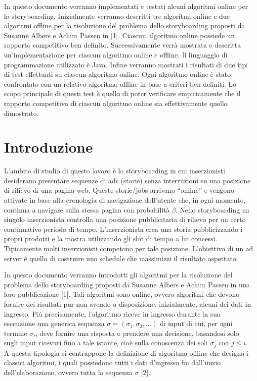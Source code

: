 \documentclass[twoside,openany,titlepage,fleqn,
	headinclude,12pt,a4paper,BCOR5mm,footinclude]{scrbook}
\begin{document}
In questo documento verranno implementati e testati alcuni algoritmi online per lo storyboarding. Inizialmente verranno descritti tre algoritmi online e due algoritmi offline per la risoluzione del problema dello storyboarding proposti da Susanne Albers e Achim Passen in [1]. Ciascun algoritmo online possiede un rapporto competitivo ben definito. Successivamente verrà mostrata e descritta un'implementazione per ciascun algoritmo online e offline. Il linguaggio di programmazione utilizzato è Java. Infine verranno mostrati i risultati di due tipi di test effettuati su ciascun algoritmo online. Ogni algoritmo online è stato confrontato con un relativo algoritmo offline in base a criteri ben definiti. Lo scopo principale di questi test è quello di poter verificare empiricamente che il rapporto competitivo di ciascun algoritmo online sia effettivamente quello dimostrato.
\tableofcontents
\listoffigures

\cleardoublepage
\chapter{Introduzione}
L’ambito di studio di questo lavoro è lo storyboarding in cui inserzionisti desiderano presentare sequenze di ads (storie) senza interruzioni su una posizione di rilievo di una pagina web. Queste storie/jobs arrivano “online” e vengono attivate in base alla cronologia di navigazione dell'utente che, in ogni momento, continua a navigare sulla stessa pagina con probabilità $\beta$. Nello storyboarding un singolo inserzionista controlla una posizione pubblicitaria di rilievo per un certo continuativo periodo di tempo. L’inserzionista crea una storia pubblicizzando i propri prodotti e la mostra utilizzando gli slot di tempo a lui concessi. Tipicamente molti inserzionisti competono per tale posizione. L’obiettivo di un ad server è quello di costruire uno schedule che massimizzi il risultato aspettato. 

In questo documento verranno introdotti gli algoritmi per la risoluzione del problema dello storyboarding proposti da Susanne Albers e Achim Passen in una loro pubblicazione [1]. Tali algoritmi sono online, ovvero algoritmi che devono fornire dei risultati pur non avendo a disposizione, inizialmente, alcuni dei dati in ingresso. Più precisamente, l'algoritmo riceve in ingresso durante la sua esecuzione una generica sequenza $\sigma = (\sigma_{1}, \sigma_{2}, ...)$ di input di cui, per ogni termine $\sigma_{i}$, deve fornire una risposta o prendere una decisione, basandosi solo sugli input ricevuti fino a tale istante, cioè sulla conoscenza dei soli $\sigma_{j}$ con $j \leq i$. A questa tipologia si contrappone la definizione di algoritmo offline che designa i classici algoritmi, i quali possiedono tutti i dati d'ingresso fin dall'inizio dell'elaborazione, ovvero tutta la sequenza $\sigma$ [2].
\end{document}
